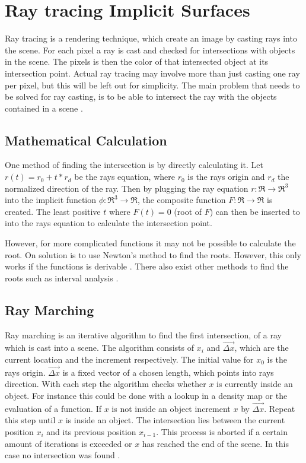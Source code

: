 \section{Ray tracing Implicit Surfaces}
Ray tracing is a rendering technique, which create an image by casting rays into the scene. For each pixel a ray is cast and checked for intersections with objects in the scene. The pixels is then the color of that intersected object at its intersection point. Actual ray tracing may involve more than just casting one ray per pixel, but this will be left out for simplicity. The main problem that needs to be solved for ray casting, is to be able to intersect the ray with the objects contained in a scene \cite{bungartz:2013:einfuhrung}.

\subsection{Mathematical Calculation}
One method of finding the intersection is by directly calculating it. Let $r(t) = r_0 + t*r_d$ be the rays equation, where $r_0$ is the rays origin and $r_d$ the normalized direction of the ray. Then by plugging the ray equation $r : \Re \rightarrow \Re^{3} $ into the implicit function $\phi : \Re^{3} \rightarrow \Re $, the composite function $F : \Re \rightarrow \Re$ is created. The least positive $t$ where $F(t) = 0$ (root of $F$) can then be inserted to into the rays equation to calculate the intersection point\cite{hart:1996:sphere}.

However, for more complicated functions it may not be possible to calculate the root. On solution is to use Newton’s method to find the roots. However, this only works if the functions is derivable \cite{hart:1996:sphere}. There also exist other methods to find the roots such as interval analysis \cite{mitchell:1990:robust}.


\subsection{Ray Marching}
Ray marching is an iterative algorithm to find the first intersection, of a ray which is cast into a scene. The algorithm consists of $x_i$ and $\vec{ \Delta x}$, which are the current location and the increment respectively. The initial value for $x_0$ is the rays origin. $\vec{ \Delta x}$ is a fixed vector of a chosen length, which points into rays direction. With each step the algorithm checks whether $x$ is currently inside an object. For instance this could be done with a lookup in a density map or the evaluation of a function. If $x$ is not inside an object increment $x$ by $\vec{ \Delta x}$. Repeat this step until $x$ is inside an object. The intersection lies between the current position  $x_i$ and its previous position  $x_{i-1}$. This process is aborted if a certain amount of iterations is exceeded or $x$ has reached the end of the scene. In this case no intersection was found \cite{tuy:1984:direct} \cite{perlin:1989:hypertexture}.

